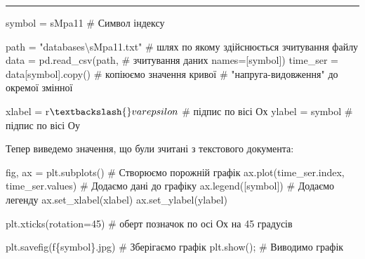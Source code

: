\documentclass[
  letterpaper,
]{report}
\newenvironment{Shaded}{\begin{snugshade}}{\end{snugshade}}
\newcommand{\CommentTok}[1]{\textcolor[rgb]{0.37,0.37,0.37}{#1}}
\newcommand{\DecValTok}[1]{\textcolor[rgb]{0.68,0.00,0.00}{#1}}
\newcommand{\NormalTok}[1]{\textcolor[rgb]{0.00,0.23,0.31}{#1}}
\newcommand{\OperatorTok}[1]{\textcolor[rgb]{0.37,0.37,0.37}{#1}}
\newcommand{\SpecialCharTok}[1]{\textcolor[rgb]{0.37,0.37,0.37}{#1}}
\newcommand{\SpecialStringTok}[1]{\textcolor[rgb]{0.13,0.47,0.30}{#1}}
\newcommand{\StringTok}[1]{\textcolor[rgb]{0.13,0.47,0.30}{#1}}
\newcommand{\VerbatimStringTok}[1]{\textcolor[rgb]{0.13,0.47,0.30}{#1}}
\begin{document}
\begin{center}\rule{0.5\linewidth}{0.5pt}\end{center}

\begin{Shaded}
\begin{Highlighting}[]
\NormalTok{symbol }\OperatorTok{=} \StringTok{\textquotesingle{}sMpa11\textquotesingle{}}                 \CommentTok{\# Символ індексу}

\NormalTok{path }\OperatorTok{=} \StringTok{"databases\textbackslash{}sMpa11.txt"}     \CommentTok{\# шлях по якому здійснюється зчитування файлу}
\NormalTok{data }\OperatorTok{=}\NormalTok{ pd.read\_csv(path,          }\CommentTok{\# зчитування даних }
\NormalTok{                   names}\OperatorTok{=}\NormalTok{[symbol])}
\NormalTok{time\_ser }\OperatorTok{=}\NormalTok{ data[symbol].copy()    }\CommentTok{\# копіюємо значення кривої }
                                  \CommentTok{\# "напруга{-}видовження" до окремої змінної}

\NormalTok{xlabel }\OperatorTok{=} \VerbatimStringTok{r\textquotesingle{}$\textbackslash{}varepsilon$\textquotesingle{}}    \CommentTok{\# підпис по вісі Ох }
\NormalTok{ylabel }\OperatorTok{=}\NormalTok{ symbol              }\CommentTok{\# підпис по вісі Оу}
\end{Highlighting}
\end{Shaded}

Тепер виведемо значення, що були зчитані з текстового документа:

\begin{Shaded}
\begin{Highlighting}[]
\NormalTok{fig, ax }\OperatorTok{=}\NormalTok{ plt.subplots()                   }\CommentTok{\# Створюємо порожній графік}
\NormalTok{ax.plot(time\_ser.index, time\_ser.values)   }\CommentTok{\# Додаємо дані до графіку}
\NormalTok{ax.legend([symbol])                        }\CommentTok{\# Додаємо легенду}
\NormalTok{ax.set\_xlabel(xlabel)}
\NormalTok{ax.set\_ylabel(ylabel)}

\NormalTok{plt.xticks(rotation}\OperatorTok{=}\DecValTok{45}\NormalTok{)                    }\CommentTok{\# оберт позначок по осі Ох на 45 градусів}

\NormalTok{plt.savefig(}\SpecialStringTok{f\textquotesingle{}}\SpecialCharTok{\{}\NormalTok{symbol}\SpecialCharTok{\}}\SpecialStringTok{.jpg\textquotesingle{}}\NormalTok{)               }\CommentTok{\# Зберігаємо графік }
\NormalTok{plt.show()}\OperatorTok{;}                                \CommentTok{\# Виводимо графік}
\end{Highlighting}
\end{Shaded}
\end{document}
